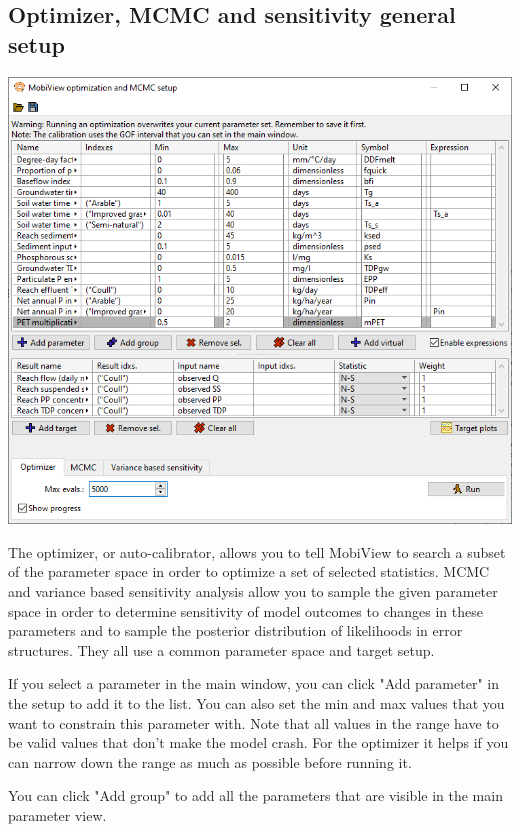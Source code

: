 \documentclass[11pt]{article}
\theoremstyle{definition}
\begin{document}
\subsection{Optimizer, MCMC and sensitivity general setup}\label{sec:optimization}
\begin{center}
\includegraphics[width=\linewidth]{img/mobiview_optimizer}
\end{center}

The optimizer, or auto-calibrator, allows you to tell MobiView to search a subset of the parameter space in order to optimize a set of selected statistics. MCMC and variance based sensitivity analysis allow you to sample the given parameter space in order to determine sensitivity of model outcomes to changes in these parameters and to sample the posterior distribution of likelihoods in error structures. They all use a common parameter space and target setup.

If you select a parameter in the main window, you can click "Add parameter" in the setup to add it to the list. You can also set the min and max values that you want to constrain this parameter with. Note that all values in the range have to be valid values that don't make the model crash. For the optimizer it helps if you can narrow down the range as much as possible before running it.

You can click "Add group" to add all the parameters that are visible in the main parameter view.
\end{document}
